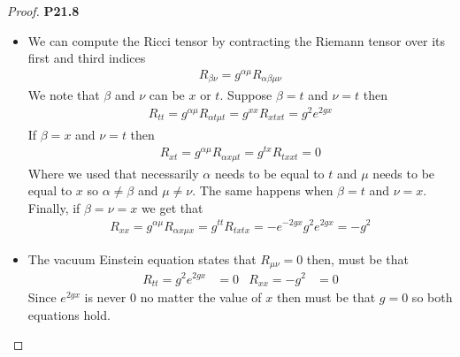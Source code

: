 \documentclass[11pt]{article}
\theoremstyle{definition}
\begin{document}
\begin{proof}{\textbf{P21.8}}
\begin{itemize}
\item [\textbf{d.}] We can compute the Ricci tensor by contracting the Riemann
tensor over its first and third indices
\begin{align*}
    R_{\beta\nu} = g^{\alpha\mu} R_{\alpha\beta\mu\nu}
\end{align*}
We note that $\beta$ and $\nu$ can be $x$ or $t$.
Suppose $\beta = t$ and $\nu = t$ then
\begin{align*}
    R_{tt} = g^{\alpha\mu} R_{\alpha t\mu t}
    = g^{xx} R_{xtxt} = g^2 e^{2gx}
\end{align*}
If $\beta = x$ and $\nu = t$ then
\begin{align*}
    R_{xt} = g^{\alpha\mu} R_{\alpha x\mu t}
    = g^{tx} R_{txxt} = 0
\end{align*}
Where we used that necessarily $\alpha$ needs to be equal to $t$ and $\mu$
needs to be equal to $x$ so $\alpha \neq \beta$ and $\mu \neq \nu$.
The same happens when $\beta = t$ and $\nu = x$. 
Finally, if $\beta = \nu = x$ we get that
\begin{align*}
    R_{xx} = g^{\alpha\mu} R_{\alpha x\mu x}
    = g^{tt} R_{txtx} = -e^{-2gx}g^2e^{2gx}
    = -g^2
\end{align*}

\item [\textbf{e.}] The vacuum Einstein equation states that $R_{\mu\nu} = 0$
then, must be that
\begin{align*}
    R_{tt} = g^2 e^{2gx} &= 0  & R_{xx} = -g^2 &= 0
\end{align*}
Since $e^{2gx}$ is never 0 no matter the value of $x$ then must be that
$g = 0$ so both equations hold.


\end{itemize}
\end{proof}
\end{document}
